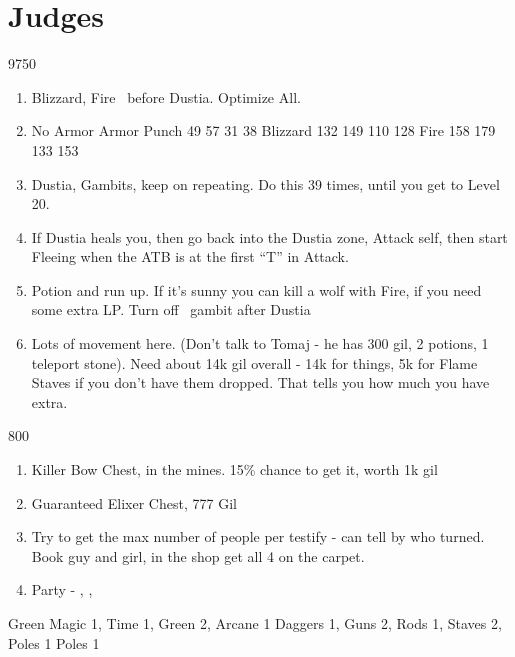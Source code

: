 \chapter{Judges}

\begin{shop}{9750}
\end{shop}
\begin{enumerate}
	\item Blizzard, Fire \vaan\ before Dustia. Optimize All.
	\item 	No Armor		Armor
	      Punch	49	57	31	38
	      Blizzard	132	149	110	128
	      Fire	158	179	133	153
	\item Dustia, Gambits, keep on repeating. Do this 39 times, until you get to Level 20.
	\item If Dustia heals you, then go back into the Dustia zone, Attack self, then start Fleeing when the ATB is at the first ``T'' in Attack.
	\item Potion and run up. If it's sunny you can kill a wolf with Fire, if you need some extra LP. Turn off \vaan\ gambit after Dustia
	\item Lots of movement here. (Don't talk to Tomaj - he has 300 gil, 2 potions, 1 teleport stone). Need about 14k gil overall - 14k for things, 5k for Flame Staves if you don't have them dropped. That tells you how much you have extra.
\end{enumerate}
\begin{shop}{800}
\end{shop}
\begin{enumerate}
	\item Killer Bow Chest, in the mines. 15\% chance to get it, worth 1k gil
	\item Guaranteed Elixer Chest, 777 Gil
	\item Try to get the max number of people per testify - can tell by who turned. Book guy and girl, in the shop get all 4 on the carpet.
	\item Party - \vaan, \balthier, \basch
\end{enumerate}
\begin{liscense}
	\begin{itemize}
		\vaanf Green Magic 1, Time 1, Green 2, Arcane 1
		\balthierf Daggers 1, Guns 2, Rods 1, Staves 2, Poles 1
		\baschf Poles 1
	\end{itemize}
\end{liscense}
